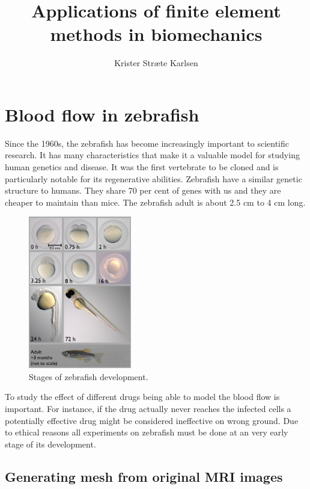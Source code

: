 \documentclass[epsfig,11pt]{article}
\title{Applications of finite element methods in biomechanics}
\author{Krister Stræte Karlsen}
\begin{document}
\maketitle

\section{Blood flow in zebrafish}

Since the 1960s, the zebrafish has become increasingly important to scientific research. It has many characteristics that make it a valuable model for studying human genetics and disease. It was the first vertebrate to be cloned and is particularly notable for its regenerative abilities. Zebrafish have a similar genetic structure to humans. They share 70 per cent of genes with us and they are cheaper to maintain than mice. The zebrafish adult is about 2.5 cm to 4 cm long. 

\begin{figure}
  \begin{center}
    \includegraphics[width=0.4\textwidth]{zebrafish.png}
  \end{center}
  \caption{Stages of zebrafish development.}
\end{figure}

To study the effect of different drugs being able to model the blood flow is important. For instance, if the drug actually never reaches the infected cells a potentially effective drug might be considered ineffective on wrong ground. Due to ethical reasons all experiments on zebrafish must be done at an very early stage of its development.


\subsection{Generating mesh from original MRI images}
\end{document}
